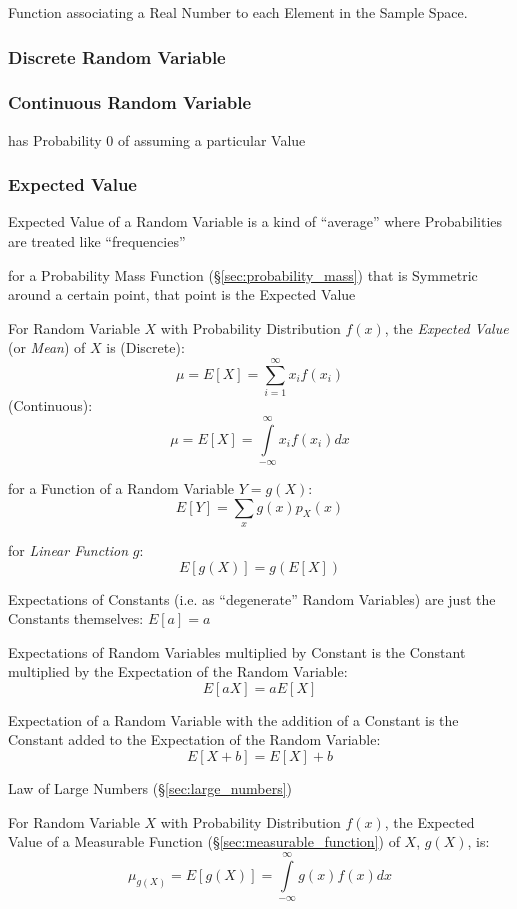Function associating a Real Number to each Element in the Sample
Space.



\subsubsection{Discrete Random Variable}
\label{sec:discrete_random_variable}

\subsubsection{Continuous Random Variable}
\label{sec:continuous_random_variable}

has Probability $0$ of assuming a particular Value



\subsubsection{Expected Value}\label{sec:expected_value}

Expected Value of a Random Variable is a kind of ``average'' where
Probabilities are treated like ``frequencies''

for a Probability Mass Function (\S\ref{sec:probability_mass}) that is
Symmetric around a certain point, that point is the Expected Value

For Random Variable $X$ with Probability Distribution $f(x)$, the
\emph{Expected Value} (or \emph{Mean}) of $X$ is (Discrete):
\[
  \mu = E[X] = \sum_{i=1}^\infty x_i f(x_i)
\]
(Continuous):
\[
  \mu = E[X] = \int\limits_{-\infty}^{\infty} x_i f(x_i) dx
\]

for a Function of a Random Variable $Y = g(X)$:
\[
  E[Y] = \sum_x g(x)p_X(x)
\]

for \emph{Linear Function} $g$:
\[
  E[g(X)] = g(E[X])
\]

Expectations of Constants (i.e. as ``degenerate'' Random Variables) are just
the Constants themselves: $E[a] = a$

Expectations of Random Variables multiplied by Constant is the Constant
multiplied by the Expectation of the Random Variable:
\[
  E[aX] = aE[X]
\]

Expectation of a Random Variable with the addition of a Constant is the
Constant added to the Expectation of the Random Variable:
\[
  E[X + b] = E[X] + b
\]

Law of Large Numbers (\S\ref{sec:large_numbers})

For Random Variable $X$ with Probability Distribution $f(x)$, the
Expected Value of a Measurable Function
(\S\ref{sec:measurable_function}) of $X$, $g(X)$, is:
\[
  \mu_{g(X)} = E[g(X)] = \int\limits_{-\infty}^{\infty} g(x) f(x) dx
\]

